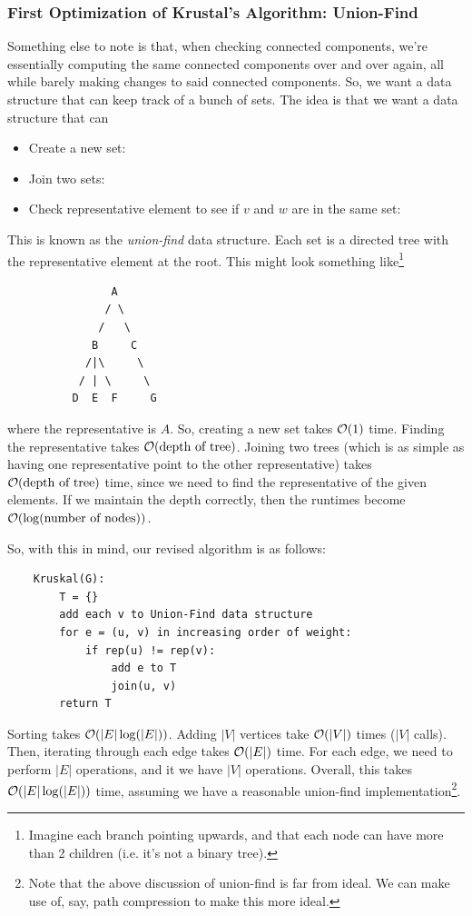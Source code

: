 \documentclass[letterpaper]{article}
\begin{document}
\subsubsection{First Optimization of Krustal's Algorithm: Union-Find}
Something else to note is that, when checking connected components, we're essentially computing the same connected components over and over again, all while barely making changes to said connected components. So, we want a data structure that can keep track of a bunch of sets. The idea is that we want a data structure that can
\begin{itemize}
    \item Create a new set: 
    \item Join two sets: 
    \item Check representative element to see if $v$ and $w$ are in the same set: 
\end{itemize}
This is known as the \emph{union-find} data structure. Each set is a directed tree with the representative element at the root. This might look something like\footnote{Imagine each branch pointing upwards, and that each node can have more than 2 children (i.e. it's not a binary tree).}
\begin{verbatim}
                A
               / \ 
              /   \ 
             B     C 
            /|\     \ 
           / | \     \ 
          D  E  F     G 
\end{verbatim}
where the representative is $A$. So, creating a new set takes $\mathcal{O}(1)$ time. Finding the representative takes $\mathcal{O}(\text{depth of tree})$. Joining two trees (which is as simple as having one representative point to the other representative) takes $\mathcal{O}(\text{depth of tree})$ time, since we need to find the representative of the given elements. If we maintain the depth correctly, then the runtimes become $\mathcal{O}(\log(\text{number of nodes}))$. 

\bigskip 

So, with this in mind, our revised algorithm is as follows: 
\begin{verbatim}
    Kruskal(G):
        T = {}
        add each v to Union-Find data structure
        for e = (u, v) in increasing order of weight:
            if rep(u) != rep(v):
                add e to T 
                join(u, v)
        return T 
\end{verbatim}
Sorting takes $\mathcal{O}(|E|\log(|E|))$. Adding $|V|$ vertices take $\mathcal{O}(|V|)$ times ($|V|$  calls). Then, iterating through each edge takes $\mathcal{O}(|E|)$ time. For each edge, we need to perform $|E|$  operations, and it we have $|V|$  operations. Overall, this takes $\mathcal{O}(|E|\log(|E|))$ time, assuming we have a reasonable union-find implementation\footnote{Note that the above discussion of union-find is far from ideal. We can make use of, say, path compression to make this more ideal.}. 
\end{document}
